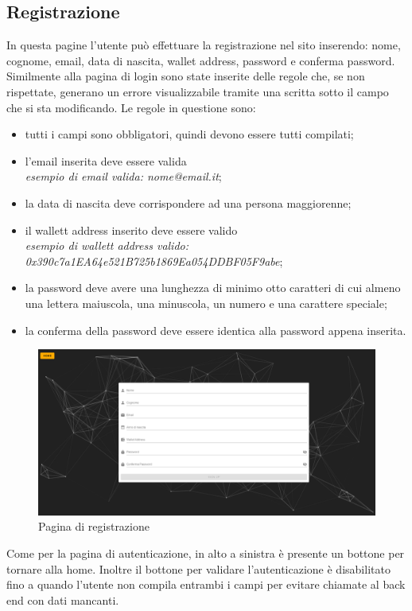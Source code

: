 \subsection{Registrazione}
In questa pagine l'utente può effettuare la registrazione nel sito inserendo: nome, cognome, email, data di nascita, wallet address, password e conferma password. Similmente alla pagina di login sono state inserite delle regole che, se non rispettate, generano un errore visualizzabile tramite una scritta sotto il campo che si sta modificando. Le regole in questione sono:
\begin{itemize}
	\item tutti i campi sono obbligatori, quindi devono essere tutti compilati;
	\item l'email inserita deve essere valida\\
	\textit{esempio di email valida: nome@email.it};
	\item la data di nascita deve corrispondere ad una persona maggiorenne;
	\item il wallett address inserito deve essere valido\\ 
	\textit{esempio di wallett address valido: 0x390c7a1EA64e521B725b1869Ea054DDBF05F9abe};
	\item la password deve avere una lunghezza di minimo otto caratteri di cui almeno una lettera maiuscola, una minuscola, un numero e una carattere speciale;
	\item la conferma della password deve essere identica alla password appena inserita.
\end{itemize}
\begin{figure}[H]
	\begin{center}
		\includegraphics[width=0.7\columnwidth]{immagini/registrazione.png}
		\caption{Pagina di registrazione}
	\end{center}
\end{figure}
Come per la pagina di autenticazione, in alto a sinistra è presente un bottone per tornare alla home. Inoltre il bottone per validare l'autenticazione è disabilitato fino a quando l'utente non compila entrambi i campi per evitare chiamate al back end con dati mancanti.
